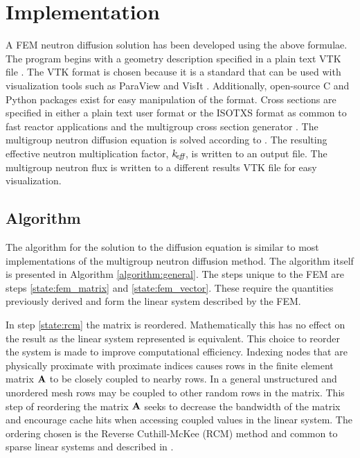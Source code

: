 \section{Implementation}
  A FEM neutron diffusion solution has been developed using 
  the above formulae. The program begins with a geometry description specified
  in a plain text VTK file \cite{vtk}. The VTK format is chosen because it is a
  standard that can be used with visualization tools such as ParaView
  \cite{ParaView} and VisIt \cite{VisIt}. Additionally, open-source C and Python
  packages exist for easy manipulation of the format. Cross sections are 
  specified in either a plain text user format or the ISOTXS format as common to 
  fast reactor applications and the multigroup cross section generator \mcc 
  \cite{mcc}. The multigroup neutron diffusion equation is solved according to 
  . The resulting effective neutron multiplication 
  factor, $k_{\!\mbox{\scriptsize \em eff}}$, is written to an output file. The multigroup neutron flux is
  written to a different results VTK file for easy visualization.

  \subsection{Algorithm}
    The algorithm for the solution to the diffusion equation is similar to most
    implementations of the multigroup neutron diffusion method. The algorithm 
    itself is presented in Algorithm \ref{algorithm:general}. The steps unique 
    to the FEM are steps \ref{state:fem_matrix} and \ref{state:fem_vector}. 
    These require the quantities previously derived and form the linear system 
    described by the FEM. 
    
    In step \ref{state:rcm} the matrix is reordered. Mathematically this has no
    effect on the result as the linear system represented is equivalent. This 
    choice to reorder the system is made to improve computational efficiency. 
    Indexing nodes that are physically proximate with proximate indices causes 
    rows in the finite element matrix $\mathbf{A}$ to be closely coupled to nearby
    rows. In a general unstructured and unordered mesh rows may be coupled to 
    other random rows in the matrix. This step of reordering the matrix $\mathbf{A}$ 
    seeks to decrease the bandwidth of the matrix and encourage cache hits when
    accessing coupled values in the linear system. The ordering chosen is the
    Reverse Cuthill-McKee (RCM) method and common to sparse linear systems and 
    described in \cite{rcm}.
    
